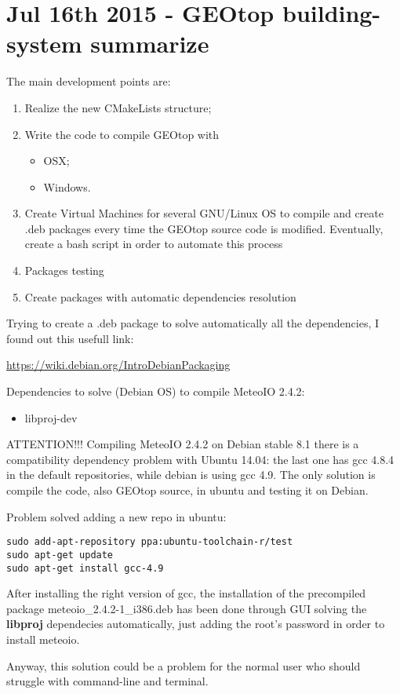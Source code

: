 \section{Jul 16th 2015 - GEOtop building-system summarize}\label{sec:20150716}

The main development points are:

\begin{enumerate}
\item Realize the new CMakeLists structure;
\item Write the code to compile GEOtop with
  \begin{itemize}
    \item OSX;
    \item Windows.
  \end{itemize}
\item Create Virtual Machines for several GNU/Linux OS to compile and create .deb packages every time the GEOtop source code is modified. Eventually, create a bash script in order to automate this process
\item Packages testing
\item Create packages with automatic dependencies resolution
\end{enumerate}

Trying to create a .deb package to solve automatically all the dependencies, I found out this usefull link:

\url{https://wiki.debian.org/IntroDebianPackaging}

\noindent Dependencies to solve (Debian OS) to compile MeteoIO 2.4.2:

\begin{itemize}
\item libproj-dev
\end{itemize}

ATTENTION!!! Compiling MeteoIO 2.4.2 on Debian stable 8.1 there is a compatibility dependency problem with Ubuntu 14.04: the last one has gcc 4.8.4 in the default repositories, while debian is using gcc 4.9. The only solution is compile the code, also GEOtop source, in ubuntu and testing it on Debian.

Problem solved adding a new repo in ubuntu:

\begin{lstlisting}[style=bashStyle]
sudo add-apt-repository ppa:ubuntu-toolchain-r/test
sudo apt-get update
sudo apt-get install gcc-4.9
\end{lstlisting}
After installing the right version of gcc, the installation of the precompiled package meteoio\_2.4.2-1\_i386.deb has been done through GUI solving the \textbf{libproj} dependecies automatically, just adding the root's password in order to install meteoio.

Anyway, this solution could be a problem for the normal user who should struggle with command-line and terminal.
